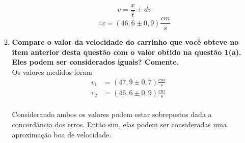 \begin{enumerate}
\begin{enumerate}
\begin{enumerate}
            \begin{equation*}
                v = \frac{x}{\bar{t}} \pm dv
            \end{equation*}
            \begin{equation}
                \therefore v = \left(46,6 \pm 0,9\right) \frac{cm}{s}
            \end{equation}
            
        \end{enumerate}

        \item \textbf{Compare o valor da velocidade do carrinho que você obteve no item anterior desta questão com o valor obtido na questão 1(a). Eles podem ser considerados iguais? Comente.} \\

        Os valores medidos foram
        \begin{align*}
            v_1 &= \left(47,9 \pm 0,7 \right) \frac{cm}{s} \\
            v_2 &= \left(46,6 \pm 0,9\right) \frac{cm}{s}\\
        \end{align*}

        Considerando ambos os valores podem estar sobrepostos dada a concordância dos erros. Então sim, elas podem ser consideradas uma aproximação boa de velocidade. 
        
    \end{enumerate}
\end{enumerate}
